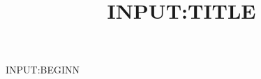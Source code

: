 \documentclass{article}
\title{{{INPUT:TITLE}}}
\date{} %
\begin{document}
\maketitle
\thispagestyle{fancy}



{{INPUT:BEGINN}}
\end{document}

